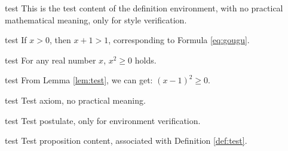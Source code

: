 \ifdefined\simpleTest
\begin{definition}\label{def:test}
\else
\begin{definition}{test}
\fi
This is the test content of the definition environment, with no practical mathematical meaning, only for style verification.
\end{definition}

\ifdefined\simpleTest
\begin{theorem}\label{thm:test}
\else
\begin{theorem}{test}
\fi
If $x>0$, then $x+1>1$, corresponding to Formula \eqref{eq:gougu}.
\end{theorem}

\ifdefined\simpleTest
\begin{lemma}\label{lem:test}
\else
\begin{lemma}{test}
\fi
For any real number $x$, $x^2\geq0$ holds.
\end{lemma}

\ifdefined\simpleTest
\begin{corollary}\label{cor:test}
\else
\begin{corollary}{test}
\fi
From Lemma \ref{lem:test}, we can get: $(x-1)^2\geq0$.
\end{corollary}

\ifdefined\simpleTest
\begin{axiom}\label{axi:test}
\else
\begin{axiom}{test}
\fi
Test axiom, no practical meaning.
\end{axiom}

\ifdefined\simpleTest
\begin{postulate}\label{pos:test}
\else
\begin{postulate}{test}
\fi
Test postulate, only for environment verification.
\end{postulate}

\ifdefined\simpleTest
\begin{proposition}\label{pro:test}
\else
\begin{proposition}{test}
\fi
Test proposition content, associated with Definition \ref{def:test}.
\end{proposition}


\end{proposition}
\end{postulate}
\end{axiom}
\end{corollary}
\end{lemma}
\end{theorem}
\end{definition}
